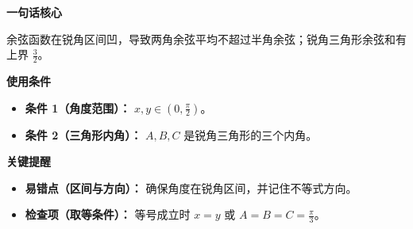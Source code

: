 \begin{summarybox}
\textbf{\textcolor{CSummary}{一句话核心}}

余弦函数在锐角区间凹，导致两角余弦平均不超过半角余弦；锐角三角形余弦和有上界 $\frac{3}{2}$。

\medskip
\textbf{\textcolor{CSummary}{使用条件}}
\begin{itemize}[leftmargin=*, itemsep=0.5em, topsep=0.4em]
    \item \textbf{条件 1（角度范围）：} $x, y \in (0, \frac{\pi}{2})$。
    \item \textbf{条件 2（三角形内角）：} $A, B, C$ 是锐角三角形的三个内角。
\end{itemize}

\medskip
\textbf{\textcolor{CSummary}{关键提醒}}
\begin{itemize}[leftmargin=*, itemsep=0.5em, topsep=0.4em]
    \item \textbf{易错点（区间与方向）：} 确保角度在锐角区间，并记住不等式方向。
    \item \textbf{检查项（取等条件）：} 等号成立时 $x=y$ 或 $A=B=C=\frac{\pi}{3}$。
\end{itemize}
\end{summarybox}
